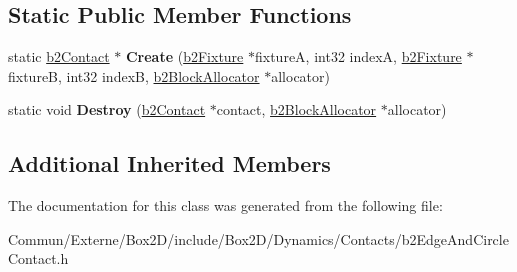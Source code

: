 \subsection*{Static Public Member Functions}
\begin{DoxyCompactItemize}
\item 
static \hyperlink{classb2_contact}{b2\+Contact} $\ast$ {\bfseries Create} (\hyperlink{classb2_fixture}{b2\+Fixture} $\ast$fixtureA, int32 indexA, \hyperlink{classb2_fixture}{b2\+Fixture} $\ast$fixtureB, int32 indexB, \hyperlink{classb2_block_allocator}{b2\+Block\+Allocator} $\ast$allocator)\hypertarget{classb2_edge_and_circle_contact_ad253e184d26e54c60fa874b329f9737e}{}\label{classb2_edge_and_circle_contact_ad253e184d26e54c60fa874b329f9737e}

\item 
static void {\bfseries Destroy} (\hyperlink{classb2_contact}{b2\+Contact} $\ast$contact, \hyperlink{classb2_block_allocator}{b2\+Block\+Allocator} $\ast$allocator)\hypertarget{classb2_edge_and_circle_contact_a7d77dd43691dad8d813450aefdb1e11e}{}\label{classb2_edge_and_circle_contact_a7d77dd43691dad8d813450aefdb1e11e}

\end{DoxyCompactItemize}
\subsection*{Additional Inherited Members}


The documentation for this class was generated from the following file\+:\begin{DoxyCompactItemize}
\item 
Commun/\+Externe/\+Box2\+D/include/\+Box2\+D/\+Dynamics/\+Contacts/b2\+Edge\+And\+Circle\+Contact.\+h\end{DoxyCompactItemize}
